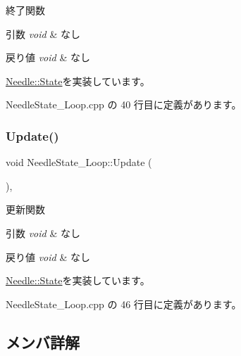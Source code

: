 終了関数 


\begin{DoxyParams}{引数}
{\em void} & なし \\
\hline
\end{DoxyParams}

\begin{DoxyRetVals}{戻り値}
{\em void} & なし \\
\hline
\end{DoxyRetVals}


\mbox{\hyperlink{class_needle_1_1_state_a8a4795ac9a90c7497ab8d039562691d2}{Needle\+::\+State}}を実装しています。



 Needle\+State\+\_\+\+Loop.\+cpp の 40 行目に定義があります。

\mbox{\label{class_needle_state___loop_ace1091782491ee594b53bf08bb9bcf12}} 
\subsubsection{\texorpdfstring{Update()}{Update()}}
{\footnotesize\ttfamily void Needle\+State\+\_\+\+Loop\+::\+Update (\begin{DoxyParamCaption}{ }\end{DoxyParamCaption})\hspace{0.3cm}{\ttfamily [override]}, {\ttfamily [virtual]}}



更新関数 


\begin{DoxyParams}{引数}
{\em void} & なし \\
\hline
\end{DoxyParams}

\begin{DoxyRetVals}{戻り値}
{\em void} & なし \\
\hline
\end{DoxyRetVals}


\mbox{\hyperlink{class_needle_1_1_state_af1455c890b581081c6135fe091984717}{Needle\+::\+State}}を実装しています。



 Needle\+State\+\_\+\+Loop.\+cpp の 46 行目に定義があります。



\subsection{メンバ詳解}
\mbox{\label{class_needle_state___loop_a742827e05002a4efb72381f410a5ef8c}} 
